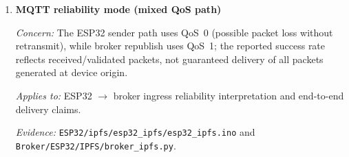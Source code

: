 \documentclass[11pt,letterpaper]{article}
\newcommand{\code}[1]{\texttt{#1}}
\begin{document}
\begin{enumerate}
  \textit{Note:} This can be switched to \code{single\_hash} mode when
  throughput-focused benchmarking is needed.

  \textit{Evidence:} \code{Broker/ESP32/IPFS/broker\_ipfs.py}.

\item \textbf{MQTT reliability mode (mixed QoS path)}

  \textit{Concern:} The ESP32 sender path uses QoS~0 (possible packet loss
  without retransmit), while broker republish uses QoS~1; the reported success
  rate reflects received/validated packets, not guaranteed delivery of all
  packets generated at device origin.

  \textit{Applies to:} ESP32 $\rightarrow$ broker ingress reliability
  interpretation and end-to-end delivery claims.

  \textit{Evidence:} \code{ESP32/ipfs/esp32\_ipfs/esp32\_ipfs.ino} and
  \code{Broker/ESP32/IPFS/broker\_ipfs.py}.

\end{enumerate}
\end{document}
